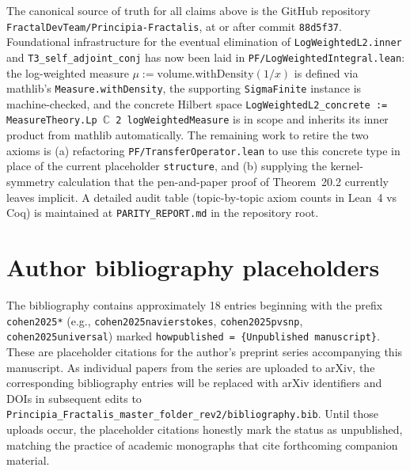 The canonical source of truth for all claims above is the GitHub repository
\texttt{FractalDevTeam/Principia-Fractalis}, at or after commit \texttt{88d5f37}.
Foundational infrastructure for the eventual elimination of
\texttt{LogWeightedL2.inner} and \texttt{T3\_self\_adjoint\_conj} has now been laid
in \texttt{PF/LogWeightedIntegral.lean}: the log-weighted measure
$\mu := \mathrm{volume.withDensity}(1/x)$ is defined via mathlib's
\texttt{Measure.withDensity}, the supporting \texttt{SigmaFinite} instance is
machine-checked, and the concrete Hilbert space
\texttt{LogWeightedL2\_concrete := MeasureTheory.Lp $\mathbb{C}$ 2 logWeightedMeasure}
is in scope and inherits its inner product from mathlib automatically. The remaining
work to retire the two axioms is (a) refactoring \texttt{PF/TransferOperator.lean}
to use this concrete type in place of the current placeholder \texttt{structure},
and (b) supplying the kernel-symmetry calculation that the pen-and-paper proof of
Theorem~20.2 currently leaves implicit.
A detailed audit table (topic-by-topic axiom counts in Lean~4 vs Coq)
is maintained at \texttt{PARITY\_REPORT.md} in the repository root.

\section*{Author bibliography placeholders}\label{sec:cohen2025-bib-status}
The bibliography contains approximately 18 entries beginning with
the prefix \texttt{cohen2025*} (e.g., \texttt{cohen2025navierstokes},
\texttt{cohen2025pvsnp}, \texttt{cohen2025universal}) marked
\texttt{howpublished = \{Unpublished manuscript\}}. These are placeholder
citations for the author's preprint series accompanying this
manuscript. As individual papers from the series are uploaded to
arXiv, the corresponding bibliography entries will be replaced with
arXiv identifiers and DOIs in subsequent edits to
\texttt{Principia\_Fractalis\_master\_folder\_rev2/bibliography.bib}.
Until those uploads occur, the placeholder citations honestly mark
the status as unpublished, matching the practice of academic monographs
that cite forthcoming companion material.

